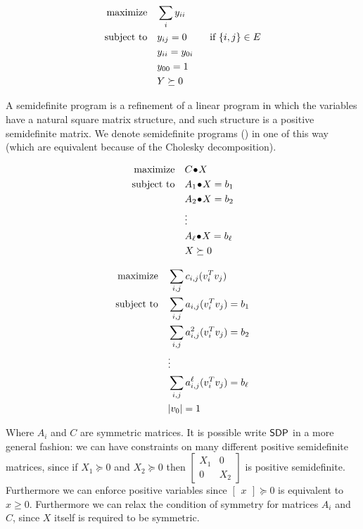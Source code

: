 \documentclass[a4paper,twoside,justified]{tufte-handout}
\begin{document}
\begin{alignat*}{2}
  \text{maximize}\hspace{1em}& \sum_{i}y_{ii}\\
  \text{subject to}\hspace{1em}& y_{ij} =0 \qquad \text{\ if $\{i,j\}\in E$}\\
  & y_{ii} = y_{0i} \\
  & y_{00} = 1\\
  & Y \succeq 0
\end{alignat*}

A semidefinite program is a refinement of a linear program in which
the variables have a natural square matrix structure, and such
structure is a positive semidefinite matrix. We denote semidefinite
programs (\sdp) in one of this way (which are equivalent because of
the Cholesky decomposition).

\begin{figure}
\begin{minipage}[t]{0.5\textwidth}
\begin{alignat*}{2}
  \maximize \pointwiseprod{C}{X}\\
  \subjectto \pointwiseprod{A_{1}}{X} = b_{1}\\
  & \pointwiseprod{A_{2}}{X} = b_{2}\\
  & \vdots \\
  & \pointwiseprod{A_{\ell}}{X} = b_{\ell}\\
  & X \succeq 0
\end{alignat*}
\end{minipage}
\begin{minipage}[t]{0.5\textwidth}
\begin{alignat*}{2}
  \text{maximize}\hspace{1em}& \sum_{i,j}c_{i,j} (v_{i}^{T}v_{j}) \\
  \text{subject to}\hspace{1em}& \sum_{i,j} a_{i,j} (v^{T}_{i}v_{j})= b_{1}\\
  & \sum_{i,j} a^{2}_{i,j} (v^{T}_{i}v_{j})= b_{2}\\
  & \vdots \\
  & \sum_{i,j} a^{\ell}_{i,j} (v^{T}_{i}v_{j})= b_{\ell}\\
  & |v_{0}| = 1
\end{alignat*}
\end{minipage}
\end{figure}
%
Where $ A_i $ and $ C $ are symmetric matrices.  It is possible write
$\mathsf{SDP}$ in a more general fashion: we can have constraints on many
different positive semidefinite matrices, since if $ X_{1}\succeq 0 $
and $ X_{2} \succeq 0$ then $ \begin{bmatrix}
  X_{1} & 0 \\
  0 & X_{2}
\end{bmatrix} $ is positive semidefinite. Furthermore we can enforce
positive variables since $ \begin{bmatrix}
  x
\end{bmatrix} \succeq 0$ is equivalent to $ x \geq 0$. Furthermore we
can relax the condition of symmetry for matrices $ A_{i} $ and $ C $,
since $ X $ itself is required to be symmetric.
\end{document}
